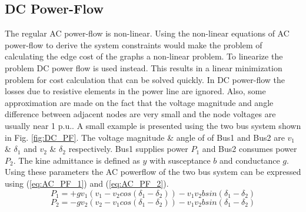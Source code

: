 \subsection{DC Power-Flow}
The regular AC power-flow is non-linear. Using the non-linear equations of AC power-flow to derive the system constraints would make the problem of calculating the edge cost of the graphs a non-linear problem. To linearize the problem DC power flow \cite{DC_PF1} is used instead. This results in a linear minimization problem for cost calculation that can be solved quickly. In DC power-flow the losses due to resistive elements in the power line are ignored. Also, some approximation are made on the fact that the voltage magnitude and angle difference between adjacent nodes are very small and the node voltages are usually near 1 p.u.. A small example is presented using the two bus system shown in Fig. \ref{fig:DC_PF}. The voltage magnitude \& angle of of Bus1 and Bus2 are $v_1$ \& $\delta_1$ and $v_2$ \& $\delta_2$ respectively. Bus1 supplies power $P_1$ and Bus2 consumes power $P_2$. The kine admittance is defined as $y$ with susceptance $b$ and conductance $g$. Using these parameters the AC powerflow of the two bus system can be expressed using (\ref{eq:AC_PF_1}) and (\ref{eq:AC_PF_2}).
\begin{equation}
\label{eq:AC_PF_1}
    P_1 = +gv_1( v_1 - v_2 cos(\delta_1 - \delta_2)) - v_1v_2bsin(\delta_1 - \delta_2)
\end{equation}
\begin{equation}
\label{eq:AC_PF_2}
    P_2 = -gv_2( v_2 - v_1 cos(\delta_1 - \delta_2)) - v_1v_2bsin(\delta_1 - \delta_2)
\end{equation}

